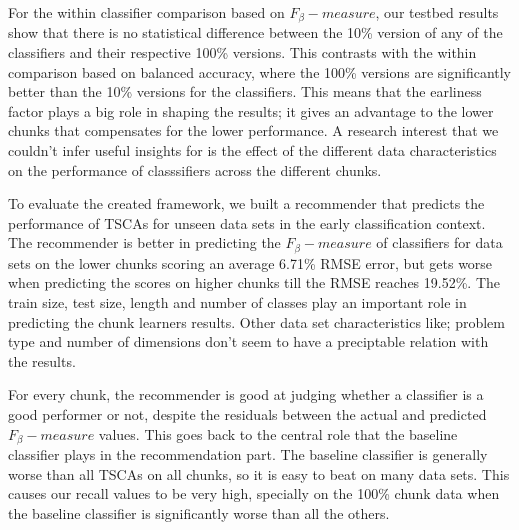 For the within classifier comparison based on $F_{\beta}-measure$, our testbed results show that there is no statistical difference between the 10\% version of any of the classifiers and their respective 100\% versions.
This contrasts with the within comparison based on balanced accuracy, where the 100\% versions are significantly better than the 10\% versions for the classifiers.
This means that the earliness factor plays a big role in shaping the results; it gives an advantage to the lower chunks that compensates for the lower performance.
A research interest that we couldn't infer useful insights for is the effect of the different data characteristics on the performance of classsifiers across the different chunks.

To evaluate the created framework, we built a recommender that predicts the performance of TSCAs for unseen data sets in the early classification context.
The recommender is better in predicting the $F_{\beta}-measure$ of classifiers for data sets on the lower chunks scoring an average 6.71\% RMSE error,
but gets worse when predicting the scores on higher chunks till the RMSE reaches 19.52\%.
The train size, test size, length and number of classes play an important role in predicting the chunk learners results.
Other data set characteristics like; problem type and number of dimensions don't seem to have a preciptable relation with the results.

For every chunk, the recommender is good at judging whether a classifier is a good performer or not, despite the residuals between the actual and predicted $F_{\beta}-measure$ values.
This goes back to the central role that the baseline classifier plays in the recommendation part.
The baseline classifier is generally worse than all TSCAs on all chunks, so it is easy to beat on many data sets.
This causes our recall values to be very high, specially on the 100\% chunk data when the baseline classifier is significantly worse than all the others.

